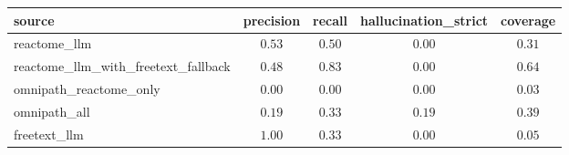 \begin{tabular}{lcccc}
\hline
source & precision & recall & hallucination\_strict & coverage \\
\hline
reactome\_llm & $0.53$ & $0.50$ & $0.00$ & $0.31$ \\
reactome\_llm\_with\_freetext\_fallback & $0.48$ & $0.83$ & $0.00$ & $0.64$ \\
omnipath\_reactome\_only & $0.00$ & $0.00$ & $0.00$ & $0.03$ \\
omnipath\_all & $0.19$ & $0.33$ & $0.19$ & $0.39$ \\
freetext\_llm & $1.00$ & $0.33$ & $0.00$ & $0.05$ \\
\hline
\end{tabular}
